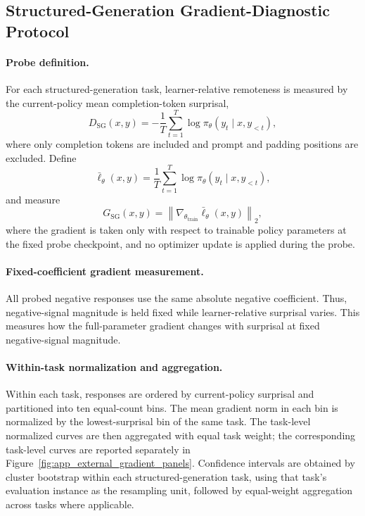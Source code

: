 \documentclass{article}
\theoremstyle{plain}
\theoremstyle{definition}
\theoremstyle{remark}
\begin{document}
\subsection{Structured-Generation Gradient-Diagnostic Protocol}
\label{app:structured_generation_gradient_diagnostic}

\paragraph{Probe definition.}
For each structured-generation task, learner-relative remoteness is
measured by the current-policy mean completion-token surprisal,
\[
D_{\mathrm{SG}}(x,y)
=
-\frac{1}{T}
\sum_{t=1}^{T}
\log \pi_\theta(y_t\mid x,y_{<t}),
\]
where only completion tokens are included and prompt and padding
positions are excluded. Define
\[
\bar{\ell}_\theta(x,y)
=
\frac{1}{T}
\sum_{t=1}^{T}
\log\pi_\theta(y_t\mid x,y_{<t}),
\]
and measure
\[
G_{\mathrm{SG}}(x,y)
=
\left\|
\nabla_{\theta_{\mathrm{train}}}
\bar{\ell}_\theta(x,y)
\right\|_2,
\]
where the gradient is taken only with respect to trainable policy
parameters at the fixed probe checkpoint, and no optimizer update is applied
during the probe.

\paragraph{Fixed-coefficient gradient measurement.}
All probed negative responses use the same absolute negative coefficient.
Thus, negative-signal magnitude is held fixed while learner-relative
surprisal varies. This measures how the full-parameter gradient changes with
surprisal at fixed negative-signal magnitude.

\paragraph{Within-task normalization and aggregation.}
Within each task, responses are ordered by current-policy surprisal and
partitioned into ten equal-count bins. The mean gradient norm in each bin
is normalized by the lowest-surprisal bin of the same task. The
task-level normalized curves are then aggregated with equal task weight;
the corresponding task-level curves are reported separately in
Figure~\ref{fig:app_external_gradient_panels}.
Confidence intervals are obtained by cluster bootstrap within each
structured-generation task, using that task's evaluation instance as the
resampling unit, followed by equal-weight aggregation across tasks where
applicable.
\end{document}
